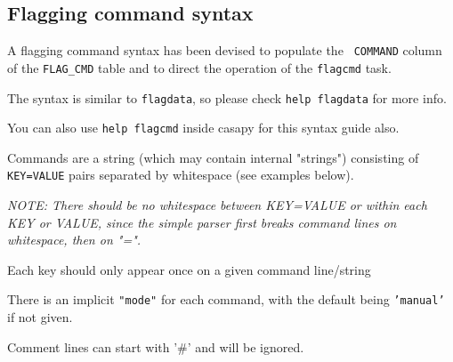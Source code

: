 \subsection{Flagging command syntax}
\label{section:edit.flagcmd.syntax}

A flagging command syntax has been devised to populate the {\tt
COMMAND} column of the {\tt FLAG\_CMD} table and to direct the 
operation of the {\tt flagcmd} task.

The syntax is similar to {\tt flagdata}, so please check {\tt help
  flagdata} for more info. 

You can also use {\tt help flagcmd} inside casapy for this syntax guide also.

Commands are a string (which may contain internal "strings")
consisting of {\tt KEY=VALUE} pairs separated by whitespace (see examples
below).

{\it NOTE: There should be no whitespace between KEY=VALUE or within each
KEY or VALUE, since the simple parser first breaks command lines on
whitespace, then on "=".}
        
Each key should only appear once on a given command line/string
        
There is an implicit {\tt "mode"} for each command, with the default being
{\tt 'manual'} if not given.

Comment lines can start with '\#' and will be ignored.
     

